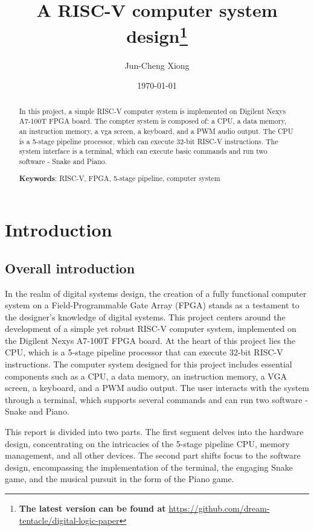 \documentclass[
	a4paper, %
	11pt, %
]{CSUniSchoolLabReport}
\title{A RISC-V computer system design\thanks{\textbf{The latest version can be found at} \url{https://github.com/dream-tentacle/digital-logic-paper}}}
\author{Jun-Cheng Xiong} %
\date{\today} %
\begin{document}
\maketitle %


\begin{abstract}
    \large{
        In this project, a simple RISC-V computer system is implemented on Digilent Nexys A7-100T FPGA board. The compter system is composed of: a CPU, a data memory, an instruction memory, a vga screen, a keyboard, and a PWM audio output. The CPU is a 5-stage pipeline processor, which can execute 32-bit RISC-V instructions. The system interface is a terminal, which can execute basic commands and run two software - Snake and Piano.

        \textbf{Keywords}: RISC-V, FPGA, 5-stage pipeline, computer system
    }
\end{abstract}
\thispagestyle{empty}
\newpage

\thispagestyle{empty}
\tableofcontents

\newpage
\setcounter{page}{1}
\section{Introduction}
\subsection{Overall introduction}

In the realm of digital systems design, the creation of a fully functional computer system on a Field-Programmable Gate Array (FPGA) stands as a testament to the designer's knowledge of digital systems. This project centers around the development of a simple yet robust RISC-V computer system, implemented on the Digilent Nexys A7-100T FPGA board. At the heart of this project lies the CPU, which is a 5-stage pipeline processor that can execute 32-bit RISC-V instructions. The computer system designed for this project includes essential components such as a CPU, a data memory, an instruction memory, a VGA screen, a keyboard, and a PWM audio output. The user interacts with the system through a terminal, which supports several commands and can run two software - Snake and Piano.

This report is divided into two parts. The first segment delves into the hardware design, concentrating on the intricacies of the 5-stage pipeline CPU, memory management, and all other devices. The second part shifts focus to the software design, encompassing the implementation of the terminal, the engaging Snake game, and the musical pursuit in the form of the Piano game.
\end{document}

